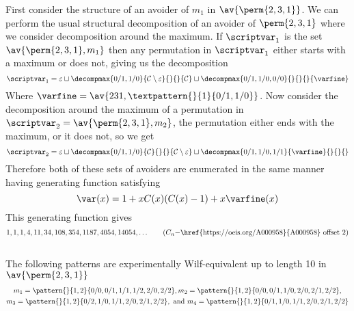 First consider the structure of an avoider of \(m_1\) in \(\av{\perm{2,3,1}}\).
We can perform the usual structural decomposition of an avoider
of \(\perm{2,3,1}\) where we consider decomposition around the maximum.
If \(\scriptvar_1\) is the set \(\av{\perm{2,3,1},m_1}\) then any permutation in
\(\scriptvar_1\) either starts with a maximum or does not, giving us the
decomposition
\begin{equation*}
    \scriptvar_1 = \varepsilon \sqcup
    \decompmax{0/1,1/0}{\mathcal{C}\setminus\varepsilon}{}{}{\mathcal{C}} \sqcup
    \decompmax{0/1,1/0,0/0}{}{}{}{\mathcal{\varfine}}
\end{equation*}
Where \(\mathcal{\varfine} = \av{231,\textpattern{}{1}{0/1,1/0}}\).
Now consider the decomposition around the maximum of a permutation in
\(\scriptvar_2 = \av{\perm{2,3,1},m_2}\), the permutation either ends with
the maximum, or it does not, so we get
\begin{equation*}
    \scriptvar_2 = \varepsilon \sqcup
    \decompmax{0/1,1/0}{\mathcal{C}}{}{}{\mathcal{C}\setminus\varepsilon} \sqcup
    \decompmax{0/1,1/0,1/1}{\mathcal{\varfine}}{}{}{}
\end{equation*}
Therefore both of these sets of avoiders are enumerated in the same manner
having generating function satisfying
\begin{equation*}
    \var(x) = 1 + xC(x)(C(x)-1) + x\varfine(x)
\end{equation*}
This generating function gives
\begin{equation*}
    1, 1, 1, 4, 11, 34, 108, 354, 1187, 4054, 14054,\dotsc \tag{\(C_n - \)\href{https://oeis.org/A000958}{A000958} offset 2}
\end{equation*}


\subsection{}
\nextvar
The following patterns are experimentally Wilf-equivalent up to length 10 in
\(\av{\perm{2,3,1}}\)
    \begin{gather*}
        m_1 = \pattern{}{1,2}{0/0,0/1,1/1,1/2,2/0,2/2},
        m_2 = \pattern{}{1,2}{0/0,0/1,1/0,2/0,2/1,2/2}, \\
        m_3 = \pattern{}{1,2}{0/2,1/0,1/1,2/0,2/1,2/2}, \text{ and }
        m_4 = \pattern{}{1,2}{0/1,1/0,1/1,2/0,2/1,2/2}
    \end{gather*}

